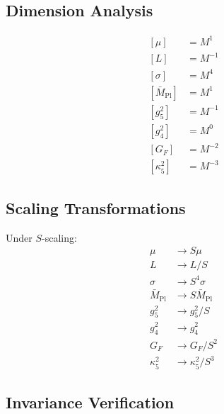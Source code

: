\documentclass[11pt,a4paper]{article}
\theoremstyle{definition}
\begin{document}
\subsection{Dimension Analysis}
\label{subsec:dim_analysis}

\begin{align}
\label{eq:dim_list_1}
[\mu] &= M^1 \\
\label{eq:dim_list_2}
[L] &= M^{-1} \\
\label{eq:dim_list_3}
[\sigma] &= M^4 \\
\label{eq:dim_list_4}
[\bar{M}_{\text{Pl}}] &= M^1 \\
\label{eq:dim_list_5}
[g_5^2] &= M^{-1} \\
\label{eq:dim_list_6}
[g_4^2] &= M^0 \\
\label{eq:dim_list_7}
[G_F] &= M^{-2} \\
\label{eq:dim_list_8}
[\kappa_5^2] &= M^{-3}
\end{align}

\subsection{Scaling Transformations}
\label{subsec:scaling}

Under $S$-scaling:
\begin{align}
\label{eq:scale_list_1}
\mu &\to S\mu \\
\label{eq:scale_list_2}
L &\to L/S \\
\label{eq:scale_list_3}
\sigma &\to S^4\sigma \\
\label{eq:scale_list_4}
\bar{M}_{\text{Pl}} &\to S\bar{M}_{\text{Pl}} \\
\label{eq:scale_list_5}
g_5^2 &\to g_5^2/S \\
\label{eq:scale_list_6}
g_4^2 &\to g_4^2 \\
\label{eq:scale_list_7}
G_F &\to G_F/S^2 \\
\label{eq:scale_list_8}
\kappa_5^2 &\to \kappa_5^2/S^3
\end{align}

\subsection{Invariance Verification}
\label{subsec:inv_verify}
\end{document}
